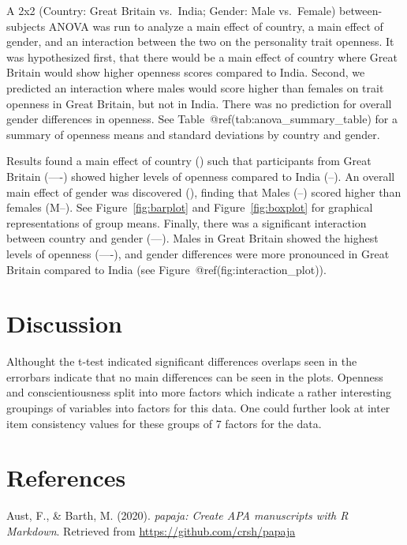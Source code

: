 \documentclass[
  english,
  man]{apa6}
\begin{document}
A 2x2 (Country: Great Britain vs.~India; Gender: Male vs.~Female) between-subjects ANOVA was run to analyze a main effect of country, a main effect of gender, and an interaction between the two on the personality trait openness. It was hypothesized first, that there would be a main effect of country where Great Britain would show higher openness scores compared to India. Second, we predicted an interaction where males would score higher than females on trait openness in Great Britain, but not in India. There was no prediction for overall gender differences in openness. See Table~@ref(tab:anova\_summary\_table) for a summary of openness means and standard deviations by country and gender.

Results found a main effect of country () such that participants from Great Britain (----) showed higher levels of openness compared to India (--). An overall main effect of gender was discovered (), finding that Males (--) scored higher than females (M--). See Figure~\ref{fig:barplot} and Figure~\ref{fig:boxplot} for graphical representations of group means. Finally, there was a significant interaction between country and gender (---). Males in Great Britain showed the highest levels of openness (----), and gender differences were more pronounced in Great Britain compared to India (see Figure~@ref(fig:interaction\_plot)).

\hypertarget{discussion}{%
\section{Discussion}\label{discussion}}

Althought the t-test indicated significant differences overlaps seen in the errorbars indicate that no main differences can be seen in the plots. Openness and conscientiousness split into more factors which indicate a rather interesting groupings of variables into factors for this data. One could further look at inter item consistency values for these groups of 7 factors for the data.

\newpage

\hypertarget{references}{%
\section{References}\label{references}}

\begingroup
\setlength{\parindent}{-0.5in}
\setlength{\leftskip}{0.5in}

\hypertarget{refs}{}
\leavevmode\hypertarget{ref-R-papaja}{}%
Aust, F., \& Barth, M. (2020). \emph{papaja: Create APA manuscripts with R Markdown}. Retrieved from \url{https://github.com/crsh/papaja}
\end{document}
